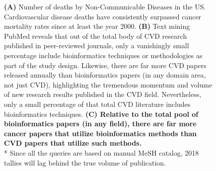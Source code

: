 \documentclass[letter]{bioinfo}
\begin{document}
\begin{figure}[!tpb]
	\caption{\textbf{(A)} Number of deaths by Non-Communicable Diseases in the US.  Cardiovascular disease deaths have consistently surpassed cancer mortality rates since at least the year 2000.  \textbf{(B)} Text mining PubMed reveals that out of the total body of CVD research published in peer-reviewed journals, only a vanishingly small percentage include bioinformatics techniques or methodologies as part of the study design.  Likewise, there are far more CVD papers released annually than bioinformatics papers (in any domain area, not just CVD), highlighting the tremendous momentum and volume of new research results published in the CVD field.  Nevertheless, only a small percentage of that total CVD literature includes bioinformatics techniques.  \textbf{(C) Relative to the total pool of bioinformatics papers (in any field), there are far more cancer papers that utilize bioinformatics methods than CVD papers that utilize such methods.}\\
	* Since all the queries are based on manual MeSH catalog, 2018 tallies will lag behind the true volume of publication.}
	\label{fig:figure1}
\end{figure}
\end{document}
